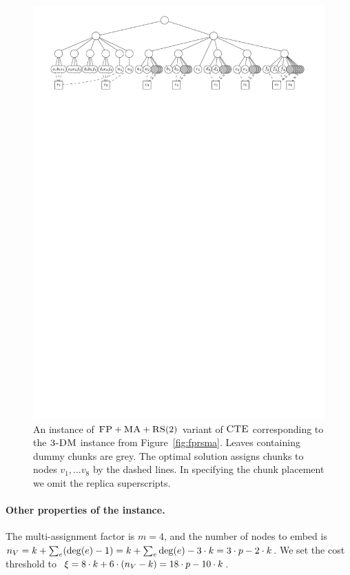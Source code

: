 \begin{figure}[t]
\centering
\includegraphics[width=1\columnwidth]{figs/static-mapping/cte-ma2.pdf}
\caption{An instance of $\textsc{FP}+\textsc{MA}+\textsc{RS}(2)$ variant of $\textsc{CTE}$ corresponding to the $\textsc{3-DM}$ instance from Figure~\ref{fig:fprsma}. Leaves containing dummy chunks are grey. The optimal solution assigns chunks to nodes $v_1, \ldots v_8$ by the dashed lines. In specifying the chunk placement we omit the replica superscripts.}
\label{fig:example-rs2}
\end{figure}


\paragraph{Other properties of the instance.}
The multi-assignment factor is $m=4$, and the number of nodes to embed is~$n_V = k + \sum_{e}(\deg(e)-1) = k + \sum_{e}\deg(e)-3\cdot k = 3\cdot p - 2\cdot k$.
 We set the cost threshold to~$\xi = 8\cdot k + 6\cdot(n_V-k) = 18\cdot p - 10\cdot k$.

